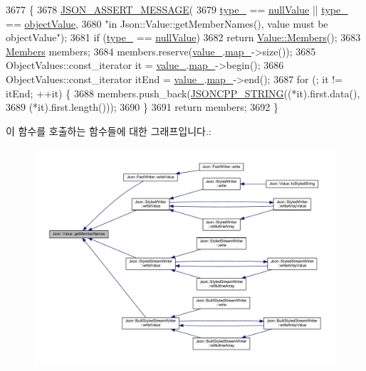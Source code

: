 \begin{DoxyCode}
3677                                          \{
3678   \hyperlink{json_8h_ad7facdeeca0f495765e3b204c265eadb}{JSON\_ASSERT\_MESSAGE}(
3679       \hyperlink{class_json_1_1_value_abd222c2536dc88bf330dedcd076d2356}{type\_} == \hyperlink{namespace_json_a7d654b75c16a57007925868e38212b4ea7d9899633b4409bd3fc107e6737f8391}{nullValue} || \hyperlink{class_json_1_1_value_abd222c2536dc88bf330dedcd076d2356}{type\_} == \hyperlink{namespace_json_a7d654b75c16a57007925868e38212b4eae8386dcfc36d1ae897745f7b4f77a1f6}{objectValue},
3680       \textcolor{stringliteral}{"in Json::Value::getMemberNames(), value must be objectValue"});
3681   \textcolor{keywordflow}{if} (\hyperlink{class_json_1_1_value_abd222c2536dc88bf330dedcd076d2356}{type\_} == \hyperlink{namespace_json_a7d654b75c16a57007925868e38212b4ea7d9899633b4409bd3fc107e6737f8391}{nullValue})
3682     \textcolor{keywordflow}{return} \hyperlink{class_json_1_1_value_a9ae9069983fc38f1928d76f9c79ac64d}{Value::Members}();
3683   \hyperlink{class_json_1_1_value_a9ae9069983fc38f1928d76f9c79ac64d}{Members} members;
3684   members.reserve(\hyperlink{class_json_1_1_value_aef578244546212705b9f81eb84d7e151}{value\_}.\hyperlink{union_json_1_1_value_1_1_value_holder_a1e7a5b86d4f52234f55c847ad1ce389a}{map\_}->size());
3685   ObjectValues::const\_iterator it = \hyperlink{class_json_1_1_value_aef578244546212705b9f81eb84d7e151}{value\_}.\hyperlink{union_json_1_1_value_1_1_value_holder_a1e7a5b86d4f52234f55c847ad1ce389a}{map\_}->begin();
3686   ObjectValues::const\_iterator itEnd = \hyperlink{class_json_1_1_value_aef578244546212705b9f81eb84d7e151}{value\_}.\hyperlink{union_json_1_1_value_1_1_value_holder_a1e7a5b86d4f52234f55c847ad1ce389a}{map\_}->end();
3687   \textcolor{keywordflow}{for} (; it != itEnd; ++it) \{
3688     members.push\_back(\hyperlink{json-forwards_8h_a1e723f95759de062585bc4a8fd3fa4be}{JSONCPP\_STRING}((*it).first.data(),
3689                                   (*it).first.length()));
3690   \}
3691   \textcolor{keywordflow}{return} members;
3692 \}
\end{DoxyCode}
이 함수를 호출하는 함수들에 대한 그래프입니다.\+:\nopagebreak
\begin{figure}[H]
\begin{center}
\leavevmode
\includegraphics[width=350pt]{class_json_1_1_value_a79d7725dce6260317333e69022367ac9_icgraph}
\end{center}
\end{figure}
